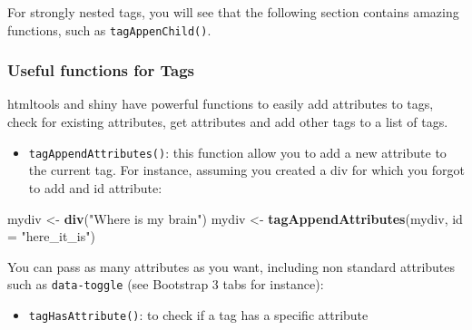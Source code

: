 \documentclass[]{book}
\newenvironment{Shaded}{\begin{snugshade}}{\end{snugshade}}
\newcommand{\CommentTok}[1]{\textcolor[rgb]{0.56,0.35,0.01}{\textit{#1}}}
\newcommand{\DataTypeTok}[1]{\textcolor[rgb]{0.13,0.29,0.53}{#1}}
\newcommand{\KeywordTok}[1]{\textcolor[rgb]{0.13,0.29,0.53}{\textbf{#1}}}
\newcommand{\NormalTok}[1]{#1}
\newcommand{\OperatorTok}[1]{\textcolor[rgb]{0.81,0.36,0.00}{\textbf{#1}}}
\newcommand{\StringTok}[1]{\textcolor[rgb]{0.31,0.60,0.02}{#1}}
\providecommand{\tightlist}{%
  \setlength{\itemsep}{0pt}\setlength{\parskip}{0pt}}
\begin{document}
For strongly nested tags, you will see that the following section contains amazing functions,
such as \texttt{tagAppenChild()}.

\hypertarget{useful-functions-for-tags}{%
\subsubsection{Useful functions for Tags}\label{useful-functions-for-tags}}

htmltools and shiny have powerful functions to easily add attributes to tags, check for
existing attributes, get attributes and add other tags to a list of tags.

\begin{itemize}
\tightlist
\item
  \texttt{tagAppendAttributes()}: this function allow you to add a new attribute to the current tag.
  For instance, assuming you created a div for which you forgot to add and id attribute:
\end{itemize}

\begin{Shaded}
\begin{Highlighting}[]
\NormalTok{mydiv <-}\StringTok{ }\KeywordTok{div}\NormalTok{(}\StringTok{"Where is my brain"}\NormalTok{)}
\NormalTok{mydiv <-}\StringTok{ }\KeywordTok{tagAppendAttributes}\NormalTok{(mydiv, }\DataTypeTok{id =} \StringTok{"here_it_is"}\NormalTok{)}
\end{Highlighting}
\end{Shaded}

You can pass as many attributes as you want, including non standard attributes such as
\texttt{data-toggle} (see Bootstrap 3 tabs for instance):

\begin{Shaded}
\end{Shaded}

\begin{itemize}
\tightlist
\item
  \texttt{tagHasAttribute()}: to check if a tag has a specific attribute
\end{itemize}
\end{document}
